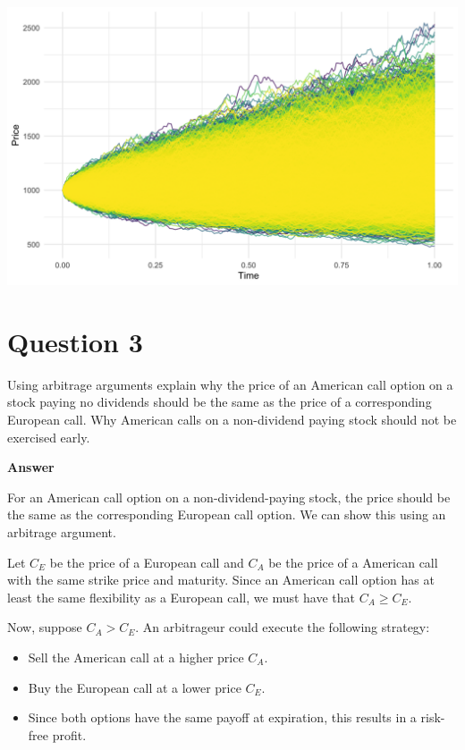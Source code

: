 \documentclass[letterpaper]{article}
\begin{document}
			\includegraphics[max width=\textwidth, center]{Q2_R_50000}
		\pagebreak
		
		\section{Question 3}
		Using arbitrage arguments explain why the price of an American call option on a stock paying no dividends should be the same as the price of a corresponding European call. Why American calls on a non-dividend paying stock should not be exercised early.
		
		\textbf{Answer}
		
		For an American call option on a non-dividend-paying stock, the price should be the same as the corresponding European call option. We can show this using an arbitrage argument.
		
		Let $C_E$ be the price of a {European call} and $C_A$ be the price of a {American call} with the same strike price and maturity. Since an American call option has at least the same flexibility as a European call, we must have that $C_A \geq C_E$. 
		
		Now, suppose $C_A > C_E$. An arbitrageur could execute the following strategy:
		
		\begin{itemize}
			\item Sell the American call at a higher price $C_A$.
			\item Buy the European call at a lower price $C_E$.
			\item Since both options have the same payoff at expiration, this results in a risk-free profit.
		\end{itemize}
		
\end{document}
